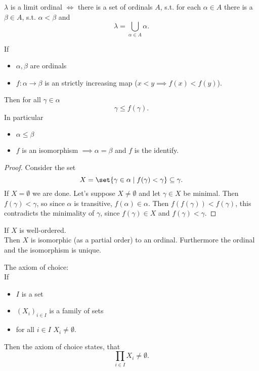 \begin{exercise}
    $\lambda$ is a limit ordinal $\iff$ there is a set of ordinals $A$, 
    s.t. for each $\alpha \in A$ there is a $\beta \in A$, s.t. $\alpha < \beta$ and 
    $$ \lambda = \bigcup_{\alpha \in A} \alpha.$$
\end{exercise}

\begin{lemma}
    If 
    \begin{itemize}
        \item $\alpha, \beta$ are ordinals
        \item $f: \alpha \to \beta$ is an strictly increasing map ($x<y \implies f(x) < f(y)$).
    \end{itemize}
    Then for all $\gamma \in \alpha$
    $$ \gamma \leq f(\gamma).$$
    In particular 
    \begin{itemize}
        \item $\alpha \leq \beta$
        \item $f$ is an isomorphism $ \implies \alpha = \beta$ and $f$ is the identify.
    \end{itemize}
\end{lemma}
\begin{proof}
    Consider the set
    $$ X = \set{\gamma \in \alpha \mid f(\gamma) < \gamma} \subseteq \gamma.$$
    If $X = \emptyset$ we are done. Let's suppose $X \ne \emptyset$ and let $\gamma \in X$ be minimal.
    Then $f(\gamma) < \gamma$, so since $\alpha$ is transitive, $f(\alpha) \in \alpha$.
    Then $f(f(\gamma)) < f(\gamma)$, this contradicts the minimality of $\gamma$, since $f(\gamma) \in X$ and $f(\gamma) < \gamma$.    
\end{proof}

\begin{theorem}\label{thm:1}
    If $X$ is well-ordered.\\
    Then $X$ is isomorphic (as a partial order) to an ordinal. Furthermore the ordinal and the isomorphism is unique.
\end{theorem}

\begin{recall}
    The axiom of choice:\\
    If 
    \begin{itemize}
        \item $I$ is a set
        \item $(X_i)_{i\in I}$ is a family of sets
        \item for all $i \in I$ $X_i \ne \emptyset$.
    \end{itemize}
    Then the axiom of choice states, that
    $$ \prod_{i \in I} X_i \ne \emptyset.$$
\end{recall}

